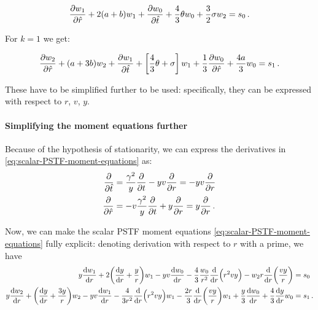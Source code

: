 \documentclass[main.tex]{subfiles}
\begin{document}
\begin{equation}
    \pdv{w_{1}}{\hat{r}} +2( a+ b) w_{1}+\pdv{w_0}{\hat{t}}+\frac{4}{3} \theta w_{0} + \frac{3}{2} \sigma w_{2} = s_0\,.
\end{equation}

For \(k=1\) we get:

\begin{equation}
    \pdv{w_{2}}{\hat{r}} + (a+3 b) w_{2}+\pdv{w_1}{\hat{t}}+\left[\frac{4}{3} \theta+ \sigma\right] w_{1} +\frac{1}{3} \pdv{w_{0}}{\hat{r}}+\frac{4 a}{3} w_{0} = s_1\,.
\end{equation}

These have to be simplified further to be used: specifically, they can be expressed with respect to \(r\), \(v\), \(y\).

\paragraph{Simplifying the moment equations further}


Because of the hypothesis of stationarity, we can express the derivatives in \eqref{eq:scalar-PSTF-moment-equations} as:
%
\begin{subequations}
\begin{align}
  \pdv{}{\hat{t}} &= \frac{\gamma^2}{y} \pdv{}{t} - yv \pdv{}{r} = - yv \pdv{}{r}  \\
  \pdv{}{\hat{r}} &= -v \frac{\gamma^2}{y} \pdv{}{t} + y \pdv{}{r} = y \pdv{}{r}\,.
\end{align}
\end{subequations}

Now, we can make the scalar PSTF moment equations \eqref{eq:scalar-PSTF-moment-equations} fully explicit: denoting derivation with respect to \(r\) with a prime, we have
\begin{subequations}
\begin{align}
  y \dv{w_1}{r} + 2 \qty(\dv{y}{r} + \frac{y}{r}) w_1
  -yv \dv{w_0}{r}
  - \frac{4}{3} \frac{w_0}{r^2} \dv{}{r}\qty(r^2 v y)
  - w_2 r \dv{}{r}\qty(\frac{vy}{r}) &= s_0  \\
  y \dv{w_2}{r} + \qty(\dv{y}{r} + \frac{3y}{r})w_2
  - yv \dv{w_1 }{r} - \frac{4}{3r^2} \dv{}{r}\qty(r^2 vy) w_1
  - \frac{2r}{3} \dv{}{r}\qty(\frac{vy}{r}) w_1
  + \frac{y}{3} \dv{w_0}{r} + \frac{4}{3} \dv{y}{r} w_0
  &= s_1\,.
\end{align}
\end{subequations}
\end{document}
